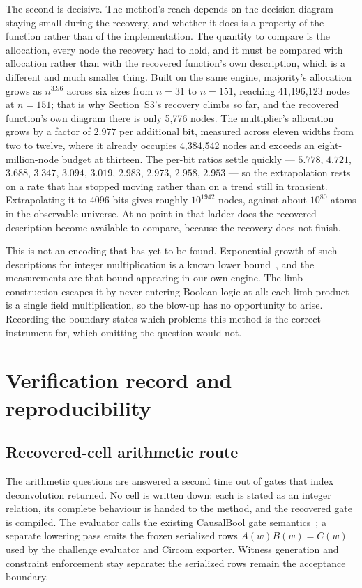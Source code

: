 \documentclass[11pt,a4paper]{article}
\begin{document}
The second is decisive. The method's reach depends on the decision diagram
staying small during the recovery, and whether it does is a property of the
function rather than of the implementation. The quantity to compare is the
allocation, every node the recovery had to hold, and it must be compared with
allocation rather than with the recovered function's own description, which is a
different and much smaller thing. Built on the same engine, majority's
allocation grows as $n^{3.96}$ across six sizes from $n=31$ to $n=151$, reaching
41{,}196{,}123 nodes at $n=151$; that is why Section~S3's recovery climbs so
far, and the recovered function's own diagram there is only 5{,}776 nodes. The
multiplier's allocation grows by a factor of $2.977$ per additional bit,
measured across eleven widths from two to twelve, where it already occupies
4{,}384{,}542 nodes and exceeds an eight-million-node budget at thirteen. The
per-bit ratios settle quickly --- $5.778$, $4.721$, $3.688$, $3.347$, $3.094$,
$3.019$, $2.983$, $2.973$, $2.958$, $2.953$ --- so the extrapolation rests on a
rate that has stopped moving rather than on a trend still in transient.
Extrapolating it to 4096 bits gives roughly $10^{1942}$ nodes, against about
$10^{80}$ atoms in the observable universe. At no point in that ladder does the
recovered description become available to compare, because the recovery does not
finish.

This is not an encoding that has yet to be found. Exponential growth of such
descriptions for integer multiplication is a known lower bound~\cite{bryant},
and the measurements are that bound appearing in our own engine. The limb
construction escapes it by never entering Boolean logic at all: each limb
product is a single field multiplication, so the blow-up has no opportunity to
arise. Recording the boundary states which problems this method is the correct
instrument for, which omitting the question would not.

\section{Verification record and reproducibility}
\subsection{Recovered-cell arithmetic route}
The arithmetic questions are answered a second time out of gates that index
deconvolution returned. No cell is written down: each is stated as an integer
relation, its complete behaviour is handed to the method, and the recovered
gate is compiled. The evaluator calls the existing CausalBool gate
semantics~\cite{causalbool}; a separate lowering pass emits the frozen
serialized rows $A(w)B(w)=C(w)$ used by the challenge evaluator and Circom
exporter. Witness generation and constraint enforcement stay separate: the
serialized rows remain the acceptance boundary.
\end{document}
